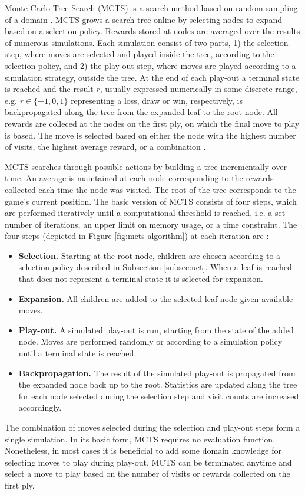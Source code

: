 \documentclass{ecai2014}
\begin{document}
Monte-Carlo Tree Search (MCTS) is a search method based on random sampling of a domain \cite{coulom2007efficient,kocsis2006bandit}. MCTS grows a search tree online by selecting nodes to expand based on a selection policy. Rewards stored at nodes are averaged over the results of numerous simulations. Each simulation consist of two parts, 1) the selection step, where moves are selected and played inside the tree, according to the selection policy, and 2) the play-out step, where moves are played according to a simulation strategy, outside the tree. At the end of each play-out a terminal state is reached and the result $r$, usually expressed numerically in some discrete range, e.g. $r \in \{-1, 0, 1\}$ representing a loss, draw or win, respectively, is backpropagated along the tree from the expanded leaf to the root node. All rewards are colleced at the nodes on the first ply, on which the final move to play is based. The move is selected based on either the node with the highest number of visits, the highest average reward, or a combination \cite{chaslot2008progressive}. 

MCTS searches through possible actions by building a tree incrementally over time. An average is maintained at each node corresponding to the rewards collected each time the node was visited. The root of the tree corresponds to the game's current position. The basic version of MCTS consists of four steps, which are performed iteratively until a computational threshold is reached, i.e. a set number of iterations, an upper limit on memory usage, or a time constraint. The four steps (depicted in Figure \ref{fig:mcts-algorithm}) at each iteration are \cite{chaslot2008progressive}:
\begin{itemize}
\item {\bf Selection.} Starting at the root node, children are chosen according to a selection policy described in Subsection \ref{subsec:uct}. When a leaf is reached that does not represent a terminal state it is selected for expansion.
\item {\bf Expansion.} All children are added to the selected leaf node given available moves.
\item {\bf Play-out.} A simulated play-out is run, starting from the state of the added node. Moves are performed randomly or according to a simulation policy until a terminal state is reached.
\item {\bf Backpropagation.} The result of the simulated play-out is propagated from the expanded node back up to the root. Statistics are updated along the tree for each node selected during the selection step and visit counts are increased accordingly.
\end{itemize}
The combination of moves selected during the selection and play-out steps form a single simulation. In its basic form, MCTS requires no evaluation function. Nonetheless, in most cases it is beneficial to add some domain knowledge for selecting moves to play during play-out. MCTS can be terminated anytime and select a move to play based on the number of visits or rewards  collected on the first ply.
\end{document}
